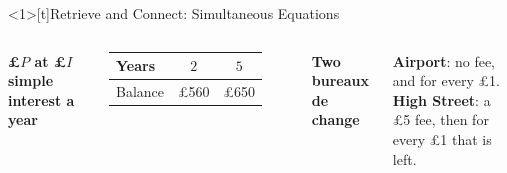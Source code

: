 \documentclass{beamer}
\newcommand{\receipt}[4]{%
  \draw[fill=yellow!4, draw=black!60]
    (#1,0) -- ({#1+1.95},0) -- ({#1+1.95},-1.3)
    \foreach \i in {1,...,6} { -- ({#1+1.95-0.325*\i+0.1625},-1.38) -- ({#1+1.95-0.325*\i},-1.3) }
    -- cycle;
  \node[anchor=west] at ({#1+0.1},-0.25) {#2};
  \node[anchor=west] at ({#1+0.1},-0.58) {#3};
  \draw[black!50, dashed] ({#1+0.1},-0.8) -- ({#1+1.85},-0.8);
  \node[anchor=west, font=\scriptsize\bfseries] at ({#1+0.1},-1.05) {Total};
  \node[anchor=east] at ({#1+1.85},-1.05) {#4};
}
\begin{document}
\begin{frame}<1>[t]{Retrieve and Connect: Simultaneous Equations}
\begin{columns}[T,onlytextwidth]

\vspace{-0.4em}

\vspace{0.8em}
{\scriptsize\bfseries \pounds$P$ at \pounds$I$ simple interest a year}\par
\vspace{0.2em}
{\scriptsize
\renewcommand{\arraystretch}{1.3}
\begin{tabular}{l|c|c}
  Years   & $2$        & $5$\\ \hline
  Balance & \pounds560 & \pounds650
\end{tabular}}

\vspace{0.9em}
{\scriptsize\bfseries Two bureaux de change}\par
\vspace{0.2em}
\parbox{\linewidth}{\raggedright\scriptsize
  \textbf{Airport}: no fee, and  for every \pounds1.\\[2pt]
  \textbf{High Street}: a \pounds5 fee, then  for every \pounds1 that is left.}


\end{columns}
\end{frame}
\end{document}
